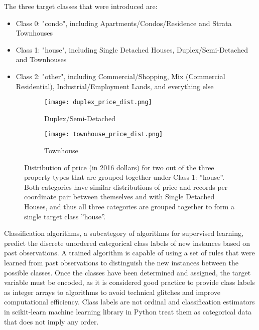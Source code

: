 \vspace{5mm}

The three target classes that were introduced are:

\begin{itemize}
    \item Class 0: "condo", including Apartments/Condos/Residence and Strata Townhouses
    \item Class 1: "house", including Single Detached Houses, Duplex/Semi-Detached and Townhouses
    \item Class 2: "other", including Commercial/Shopping, Mix (Commercial Residential), Industrial/Employment Lands, and everything else
\end{itemize}

\begin{figure}[ht]
    \centering
    \begin{subfigure}{\linewidth}
        \centering
        \texttt{[image: duplex\_price\_dist.png]}
        \label{fig:duplex_price_dist}
        \caption{Duplex/Semi-Detached}
    \end{subfigure}

    \begin{subfigure}{\linewidth}
        \centering
        \texttt{[image: townhouse\_price\_dist.png]}
        \label{fig:townhouse_price_dist}
        \caption{Townhouse}
    \end{subfigure}
    \caption{Distribution of price (in 2016 dollars) for two out of the three property types that are grouped together under Class 1: ''house''.
    Both categories have similar distributions of price and records per coordinate pair between themselves and with Single Detached Houses, and thus all three categories are grouped together to form a single target class ''house''.}
    \label{fig:class_2_price_dist}
\end{figure}

Classification algorithms, a subcategory of algorithms for supervised learning, predict the discrete unordered categorical class labels of new instances based on past observations.
A trained algorithm is capable of using a set of rules that were learned from past observations to distinguish the new instances between the possible classes.
Once the classes have been determined and assigned, the target variable must be encoded, as it is considered good practice to provide class labels as integer arrays to algorithms to avoid technical glitches and improve computational efficiency.
Class labels are not ordinal and classification estimators in scikit-learn\cite{scikit-learn} machine learning library in Python treat them as categorical data that does not imply any order.

